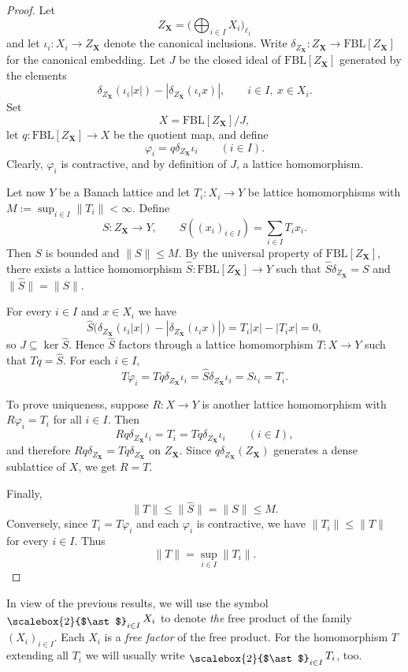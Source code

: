 \documentclass[12pt]{amsart}
\newcommand{\FBL}{\mathrm{FBL}}
\DeclareMathOperator*{\bigfree}{\raisebox{-0.6ex}{\scalebox{2}{$\ast$}}}
\theoremstyle{plain}
\theoremstyle{definition}
\begin{document}
\begin{proof}
Let
\[
Z_\textbf{X}=\Big(\bigoplus_{i\in I} X_i\Big)_{\ell_1}
\] 
and let $\iota_i:X_i\to Z_\textbf{X}$ denote the canonical inclusions. Write $\delta_{Z_\textbf{X}}:Z_\textbf{X}\to \FBL[Z_\textbf{X}]$ for the canonical embedding. Let $J$ be the closed ideal of $\FBL[Z_\textbf{X}]$ generated by the elements
\[
\delta_{Z_\textbf{X}}(\iota_i|x|)-|\delta_{Z_\textbf{X}}(\iota_i x)|,
\qquad i\in I,\ x\in X_i.
\]
Set
\[
X=\FBL[Z_\textbf{X}]/J,
\]
let $q:\FBL[Z_\textbf{X}]\to X$ be the quotient map, and define
\[
\varphi_i=q\delta_{Z_\textbf{X}}\iota_i \qquad (i\in I).
\]
Clearly, $\varphi_i$ is contractive, and by definition of $J$, a lattice homomorphism.

Let now $Y$ be a Banach lattice and let $T_i:X_i\to Y$ be lattice homomorphisms with $M:=\sup_{i\in I}\|T_i\|<\infty$. Define
\[
S:Z_\textbf{X}\to Y,\qquad S((x_i)_{i\in I})=\sum_{i\in I}T_i x_i.
\]
Then $S$ is bounded and $\|S\|\leq M$. By the universal property of $\FBL[Z_\textbf{X}]$, there exists a lattice homomorphism $\widehat{S}:\FBL[Z_\textbf{X}]\to Y$ such that $\widehat{S}\delta_{Z_\textbf{X}}=S$ and $\|\widehat{S}\|=\|S\|$.

For every $i\in I$ and $x\in X_i$ we have
\[
\widehat{S}\big(\delta_{Z_\textbf{X}}(\iota_i|x|)-|\delta_{Z_\textbf{X}}(\iota_i x)|\big)
=T_i|x|-|T_i x|=0,
\]
so $J\subseteq \ker \widehat{S}$. Hence $\widehat{S}$ factors through a lattice homomorphism $T:X\to Y$ such that $Tq=\widehat{S}$. For each $i\in I$,
\[
T\varphi_i=Tq\delta_{Z_\textbf{X}}\iota_i=\widehat{S}\delta_{Z_\textbf{X}}\iota_i=S\iota_i=T_i.
\]

To prove uniqueness, suppose $R:X\to Y$ is another lattice homomorphism with $R\varphi_i=T_i$ for all $i\in I$. Then
\[
Rq\delta_{Z_\textbf{X}}\iota_i=T_i=Tq\delta_{Z_\textbf{X}}\iota_i
\qquad (i\in I),
\]
and therefore $Rq\delta_{Z_\textbf{X}}=Tq\delta_{Z_\textbf{X}}$ on $Z_\textbf{X}$. Since $q\delta_{Z_\textbf{X}}(Z_\textbf{X})$ generates a dense sublattice of $X$, we get $R=T$.

Finally,
\[
\|T\|\leq \|\widehat{S}\|=\|S\|\leq M.
\]
Conversely, since $T_i=T\varphi_i$ and each $\varphi_i$ is contractive, we have $\|T_i\|\leq \|T\|$ for every $i\in I$. Thus
\[
\|T\|=\sup_{i\in I}\|T_i\|.
\]
\end{proof}

In view of the previous results, we will use the symbol $\bigfree_{i\in I} X_i$ to denote \textit{the} free product of the family $(X_i)_{i\in I}$. Each $X_i$ is a \textit{free factor} of the free product. For the homomorphism $T$ extending all $T_i$ we will usually write $\bigfree_{i\in I} T_i$, too.
\end{document}
